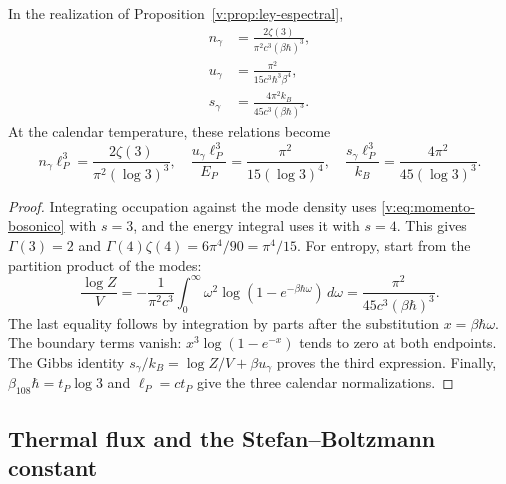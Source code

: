 \begin{proposition}
\label{v:prop:densidades-termicas}
In the realization of Proposition~\ref{v:prop:ley-espectral},
\begin{align}
 n_\gamma&=\frac{2\zeta(3)}{\pi^2c^3(\beta\hbar)^3},\\
 u_\gamma&=\frac{\pi^2}{15c^3\hbar^3\beta^4},\\
 s_\gamma&=\frac{4\pi^2 k_B}{45c^3(\beta\hbar)^3}.
 \label{v:eq:densidades-termicas}
\end{align}
At the calendar temperature, these relations become
\begin{equation}
 n_\gamma\ell_P^3=\frac{2\zeta(3)}{\pi^2(\log3)^3},\quad
 \frac{u_\gamma\ell_P^3}{E_P}=\frac{\pi^2}{15(\log3)^4},\quad
 \frac{s_\gamma\ell_P^3}{k_B}=\frac{4\pi^2}{45(\log3)^3}.
 \label{v:eq:densidades-calendario}
\end{equation}
\end{proposition}

\begin{proof}
Integrating occupation against the mode density uses
\eqref{v:eq:momento-bosonico} with \(s=3\), and the energy integral
uses it with \(s=4\). This gives \(\Gamma(3)=2\) and
\(\Gamma(4)\zeta(4)=6\pi^4/90=\pi^4/15\).
For entropy, start from the partition product of the modes:
\[
 \frac{\log Z}{V}=-\frac{1}{\pi^2c^3}
 \int_0^\infty\omega^2
 \log(1-e^{-\beta\hbar\omega})\,d\omega
 =\frac{\pi^2}{45c^3(\beta\hbar)^3}.
\]
The last equality follows by integration by parts after the substitution
\(x=\beta\hbar\omega\). The boundary terms vanish:
\(x^3\log(1-e^{-x})\) tends to zero at both endpoints.
The Gibbs identity \(s_\gamma/k_B=\log Z/V+\beta u_\gamma\)
proves the third expression. Finally,
\(\beta_{108}\hbar=t_P\log3\) and \(\ell_P=ct_P\) give the three
calendar normalizations.
\end{proof}



\subsection{Thermal flux and the Stefan--Boltzmann constant}

